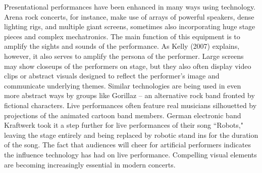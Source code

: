 Presentational performances have been enhanced in many ways using technology. Arena rock concerts, for instance, make use of arrays of powerful speakers, dense lighting rigs, and multiple giant screens, sometimes also incorporating huge stage pieces and complex mechatronics. The main function of this equipment is to amplify the sights and sounds of the performance. As Kelly (2007) explains, however, it also serves to amplify the persona of the performer. Large screens may show closeups of the performers on stage, but they also often display video clips or abstract visuals designed to reflect the performer's image and communicate underlying themes. Similar technologies are being used in even more abstract ways by groups like Gorillaz -- an alternative rock band fronted by fictional characters. Live performances often feature real musicians silhouetted by projections of the animated cartoon band members. German electronic band Kraftwerk took it a step further for live performances of their song ``Robots," leaving the stage entirely and being replaced by robotic stand ins for the duration of the song. The fact that audiences will cheer for artificial performers indicates the influence technology has had on live performance. Compelling visual elements are becoming increasingly essential in modern concerts.

